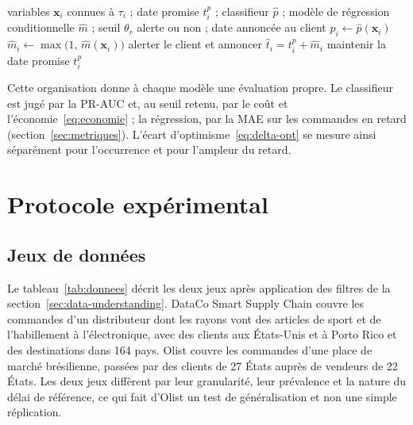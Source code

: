 \documentclass[11pt,a4paper]{article}
\theoremstyle{definition}
\begin{document}
\begin{algorithm}[!htbp]
\caption{Décision pour une commande à l'instant de prédiction}
\label{alg:decision}
\begin{algorithmic}[1]
\Require variables $\mathbf{x}_i$ connues à $\tau_i$ ; date promise $t_i^{p}$ ; classifieur $\hat{p}$ ; modèle de régression conditionnelle $\hat{m}$ ; seuil $\theta_r$
\Ensure alerte ou non ; date annoncée au client
\State $\hat{p}_i \gets \hat{p}(\mathbf{x}_i)$
 
  \State $\hat{m}_i \gets \max\bigl(1,\, \hat{m}(\mathbf{x}_i)\bigr)$ 
  \State alerter le client et annoncer $\hat{t}_i = t_i^{p} + \hat{m}_i$ 
\Else
  \State maintenir la date promise $t_i^{p}$
\EndIf
\end{algorithmic}
\end{algorithm}

Cette organisation donne à chaque modèle une évaluation propre. Le classifieur est jugé par la PR-AUC et, au seuil retenu, par le coût et l'économie~\eqref{eq:economie} ; la régression, par la MAE sur les commandes en retard (section~\ref{sec:metriques}). L'écart d'optimisme~\eqref{eq:delta-opt} se mesure ainsi séparément pour l'occurrence et pour l'ampleur du retard.

\section{Protocole expérimental}
\label{sec:design}

\subsection{Jeux de données}
\label{sec:datasets}

Le tableau~\ref{tab:donnees} décrit les deux jeux après application des filtres de la section~\ref{sec:data-understanding}. DataCo Smart Supply Chain \cite{constante2019dataco} couvre les commandes d'un distributeur dont les rayons vont des articles de sport et de l'habillement à l'électronique, avec des clients aux États-Unis et à Porto Rico et des destinations dans 164 pays. Olist \cite{olist2018brazilian} couvre les commandes d'une place de marché brésilienne, passées par des clients de 27 États auprès de vendeurs de 22 États. Les deux jeux diffèrent par leur granularité, leur prévalence et la nature du délai de référence, ce qui fait d'Olist un test de généralisation et non une simple réplication.
\end{document}
